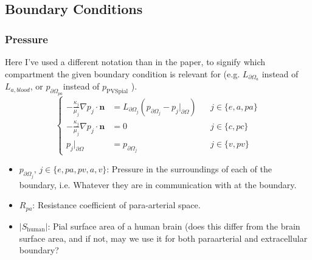 \documentclass{article}
\theoremstyle{definition}
\theoremstyle{plain}
\theoremstyle{remark}
\begin{document}
\subsection*{Boundary Conditions}

\subsubsection*{Pressure}
Here I've used a different notation than in the paper, to signify which compartment the given boundary condition is relevant for (e.g. \( L_{\partial\Omega_a} \) instead of \( L_{a, blood} \), or \( p_{\partial\Omega_{pa}} \)instead of $p_{\text{PVSpial}}$ ).
\begin{equation}
    \left\{
    \begin{aligned}
        - \frac{\kappa_j}{\mu_j} \nabla p_j \cdot \mathbf{n} &= L_{\partial \Omega_j} (p_{\partial \Omega_j} - p_j\vert_{\partial\Omega}) && j \in \{e, a, pa\} \\
        - \frac{\kappa_j}{\mu_j} \nabla p_j \cdot \mathbf{n} &= 0 && j \in \{c, pc\} \\ 
        p_j \vert_{\partial \Omega} &= p_{\partial \Omega_j} && j \in  \{v, pv\}
    \end{aligned}
\right.
\label{eq: boundary conditions}
\end{equation}

\begin{itemize}
    \item $p_{\partial\Omega_j},\, j\in \{e, pa, pv, a, v\}$: Pressure in the surroundings of each of the boundary, i.e. Whatever they are in communication with at the boundary.
    \item $R_{pa}$: Resistance coefficient of para-arterial space.
    \item \( \lvert S_{\text{human}} \rvert \): Pial surface area of a human brain (does this differ from the brain surface area, and if not, may we use it for both paraarterial and extracellular boundary?
\end{itemize}
\end{document}
